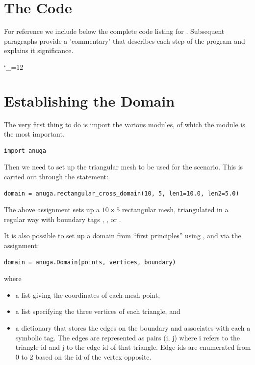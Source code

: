 \documentclass{manual}
\newcommand{\verbatiminputB}[1]{%
\endgroup}
\def\verbatiminputunderscore{\begingroup 
\catcode`\_=12
\verbatiminputB}
\begin{document}
\section{The Code}

For reference we include below the complete code listing for
. Subsequent paragraphs provide a
'commentary' that describes each step of the program and explains it
significance.

\label{ref:runup_py_code}
\verbatiminputunderscore{../../anuga_core/examples/runup.py}


\section{Establishing the Domain}

The very first thing to do is import the various modules, of which the 
\anuga{} module is the most important. 
%
\begin{verbatim}
import anuga
\end{verbatim}
%
Then we need to set up the triangular mesh to be used for the
scenario. This is carried out through the statement:

\begin{verbatim}
domain = anuga.rectangular_cross_domain(10, 5, len1=10.0, len2=5.0) 
\end{verbatim}
%
The above assignment sets up a $10 \times
5$ rectangular mesh, triangulated in a regular way with boundary tags , ,
          or . 

It is also possible to set up a domain from ``first principles'' using ,  and  via the assignment:
\begin{verbatim}
domain = anuga.Domain(points, vertices, boundary)
\end{verbatim}
where
\begin{itemize}
   \item a list  giving the coordinates of each mesh point,
   \item a list  specifying the three vertices of each triangle, and
   \item a dictionary  that stores the edges on
         the boundary and associates with each a symbolic tag. 
         The edges are represented as pairs (i, j) where i refers 
         to the triangle id and j to the edge id of that triangle. 
         Edge ids are enumerated from 0 to 2 based on the id of the vertex opposite. 
\end{itemize}
\end{document}

